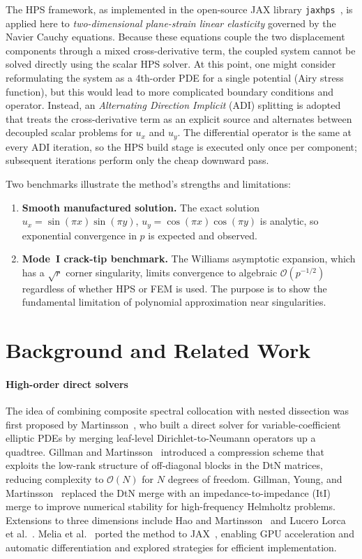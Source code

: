 \documentclass[hidelinks,onefignum,onetabnum]{siamart251216}
\begin{document}
The HPS framework, as implemented in the open-source JAX library
\texttt{jaxhps}~\cite{melia2025}, is applied here to \emph{two-dimensional
plane-strain linear elasticity} governed by the Navier Cauchy equations.
Because these equations couple the two displacement components through a mixed
cross-derivative term, the coupled system cannot be solved directly using the scalar
HPS solver. At this point, one might consider reformulating the system as a 
4th-order PDE for a single potential (Airy stress function), but this would lead
to more complicated boundary conditions and operator. Instead, an
\emph{Alternating Direction Implicit} (ADI) splitting is adopted that
treats the cross-derivative term as an explicit source and alternates between
decoupled scalar problems for $u_x$ and $u_y$. The differential operator is the same
at every ADI iteration, so the HPS build stage is executed only once per component; 
subsequent iterations perform only the cheap downward pass.

Two benchmarks illustrate the method's strengths and limitations:
\begin{enumerate}
  \item \textbf{Smooth manufactured solution.}
    The exact solution $u_x = \sin(\pi x)\sin(\pi y)$,
    $u_y = \cos(\pi x)\cos(\pi y)$ is analytic, so
    exponential convergence in $p$ is expected and observed.
  \item \textbf{Mode~I crack-tip benchmark.}
    The Williams asymptotic expansion, which has a $\sqrt{r}$ corner singularity,
    limits convergence to algebraic $\mathcal{O}(p^{-1/2})$ regardless of whether
    HPS or FEM is used. The purpose is to show the fundamental limitation of
    polynomial approximation near singularities.
\end{enumerate}

\section{Background and Related Work}
\label{sec:background}

\paragraph{High-order direct solvers}
The idea of combining composite spectral collocation with nested dissection was
first proposed by Martinsson~\cite{Martinsson2013}, who built a direct solver for
variable-coefficient elliptic PDEs by merging leaf-level Dirichlet-to-Neumann operators up a quadtree.
Gillman and Martinsson~\cite{GillmanMartinsson2014} introduced a compression scheme
that exploits the low-rank structure of off-diagonal blocks in the DtN matrices,
reducing complexity to $\mathcal{O}(N)$ for $N$ degrees of freedom.
Gillman, Young, and Martinsson~\cite{Gillman2015} replaced the DtN merge with an
impedance-to-impedance (ItI) merge to improve numerical stability for
high-frequency Helmholtz problems.
Extensions to three dimensions include Hao and Martinsson~\cite{HaoMartinsson2016} and Lucero Lorca
et al.~\cite{LuceroLorca2024}. Melia et al.~\cite{melia2025} ported the method to JAX~\cite{jax2018},
enabling GPU acceleration and automatic differentiation and explored strategies for
efficient implementation.
\end{document}
